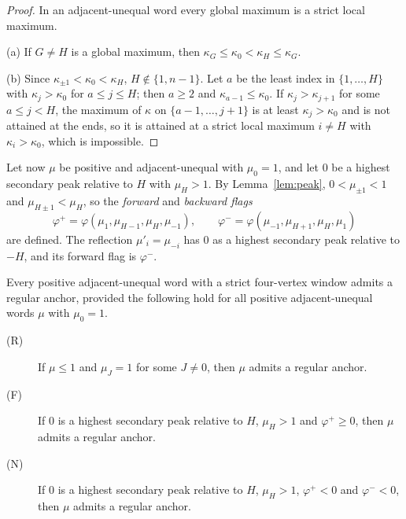 \begin{proof}
In an adjacent-unequal word every global maximum is a strict local maximum.

(a) If $G\ne H$ is a global maximum, then $\kappa_G\le\kappa_0<\kappa_H\le\kappa_G$.

(b) Since $\kappa_{\pm1}<\kappa_0<\kappa_H$, $H\notin\{1,n-1\}$. Let $a$ be the
least index in $\{1,\dots,H\}$ with $\kappa_j>\kappa_0$ for $a\le j\le H$; then
$a\ge2$ and $\kappa_{a-1}\le\kappa_0$. If $\kappa_j>\kappa_{j+1}$ for some
$a\le j<H$, the maximum of $\kappa$ on $\{a-1,\dots,j+1\}$ is at least
$\kappa_j>\kappa_0$ and is not attained at the ends, so it is attained at a
strict local maximum $i\ne H$ with $\kappa_i>\kappa_0$, which is impossible.
\end{proof}

Let now $\mu$ be positive and adjacent-unequal with $\mu_0=1$, and let $0$ be
a highest secondary peak relative to $H$ with $\mu_H>1$. By
Lemma~\ref{lem:peak}, $0<\mu_{\pm1}<1$ and $\mu_{H\pm1}<\mu_H$, so the
\emph{forward} and \emph{backward flags}
\[
  \varphi^+=\varphi(\mu_1,\mu_{H-1},\mu_H,\mu_{-1}),\qquad
  \varphi^-=\varphi(\mu_{-1},\mu_{H+1},\mu_H,\mu_1)
\]
are defined. The reflection $\mu'_i=\mu_{-i}$ has $0$ as a highest secondary
peak relative to $-H$, and its forward flag is $\varphi^-$.

\begin{proposition}\label{prop:split}
Every positive adjacent-unequal word with a strict four-vertex window admits a
regular anchor, provided the following hold for all positive adjacent-unequal
words $\mu$ with $\mu_0=1$.
\begin{description}
\item[(R)] If $\mu\le1$ and $\mu_J=1$ for some $J\ne0$, then $\mu$ admits a
  regular anchor.
\item[(F)] If $0$ is a highest secondary peak relative to $H$, $\mu_H>1$ and
  $\varphi^+\ge0$, then $\mu$ admits a regular anchor.
\item[(N)] If $0$ is a highest secondary peak relative to $H$, $\mu_H>1$,
  $\varphi^+<0$ and $\varphi^-<0$, then $\mu$ admits a regular anchor.
\end{description}
\end{proposition}

